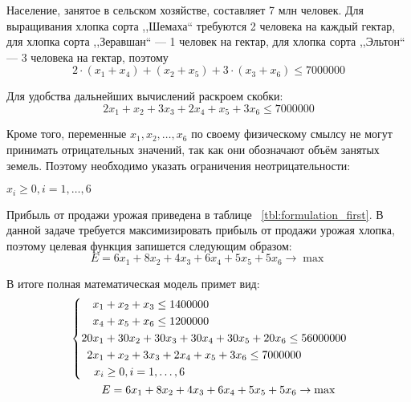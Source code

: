 Население, занятое в сельском хозяйстве, составляет 7 млн человек. Для выращивания хлопка сорта ,,Шемаха`` требуются 2 человека на каждый гектар, для хлопка сорта ,,Зеравшан`` --- 1 человек на гектар, для хлопка сорта ,,Эльтон`` --- 3 человека на гектар, поэтому
\begin{equation}
  \label{eq:pre_limit_naselenie}
  2 \cdot (x_1 + x_4) + (x_2 +x_5) + 3 \cdot (x_3 + x_6) \le 7 000 000 
\end{equation}

Для удобства дальнейших вычислений раскроем скобки:
\begin{equation}
  \label{eq:limit_naselenie}
  2x_1 + x_2 + 3x_3 + 2x_4 + x_5 + 3x_6 \le 7 000 000 
\end{equation}

Кроме того, переменные $ x_1, x_2, \ldots, x_6 $ по своему физическому смылсу не могут принимать отрицательных значений, так как они обозначают объём занятых земель. Поэтому необходимо указать ограничения неотрицательности:

$ x_i \ge 0, i = 1,\ldots,6 $ 

Прибыль от продажи урожая приведена в таблице ~\ref{tbl:formulation_first}. В данной задаче требуется максимизировать прибыль от продажи урожая хлопка, поэтому целевая функция запишется следующим образом:
\begin{equation}
  \label{eq:mainFunc}
  E = 6x_1 + 8x_2 + 4x_3 + 6x_4 + 5x_5 + 5x_6 \rightarrow \max 
\end{equation}

В итоге полная математическая модель примет вид:
\begin{equation}
  \label{eq:base_model}
	\begin{aligned}
  	&\left\{
    	\begin{aligned}
	      x_1 & + x_2 + x_3 \le 1 400 000 \\
	      x_4 & + x_5 + x_6 \le 1 200 000 \\
	      20x_1 & + 30x_2 + 30x_3 + 30x_4 + 30x_5 + 20x_6 \le 56 000 000 \\
	      2x_1 & + x_2 + 3x_3 + 2x_4 + x_5 + 3x_6 \le 7 000 000 \\
	      x_i &\ge 0, i = 1, \ldots ,6  
    	\end{aligned}
  	\right.
  	\\
  	& \hspace{10mm} E = 6x_1 + 8x_2 + 4x_3 + 6x_4 + 5x_5 + 5x_6 \rightarrow \max
	\end{aligned}
\end{equation}

\pagebreak